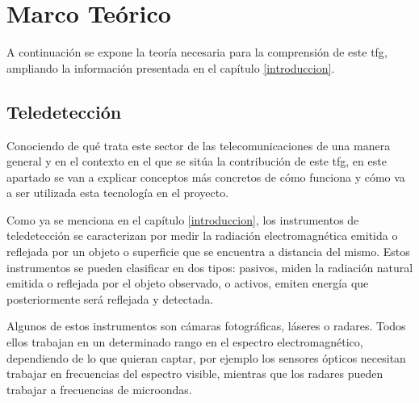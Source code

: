 

\chapter{Marco Teórico}
\label{marcoteorico}
\par A continuación se expone la teoría necesaria para la comprensión de este \gls{tfg}, ampliando la información presentada en el capítulo \ref{introduccion}.

\section{Teledetección}
\par Conociendo de qué trata este sector de las telecomunicaciones de una manera general y en el contexto en el que se sitúa la contribución de este \gls{tfg}, en este apartado se van a explicar conceptos más concretos de cómo funciona y cómo va a ser utilizada esta tecnología en el proyecto. 
\\
\par Como ya se menciona en el capítulo \ref{introduccion}, los instrumentos de teledetección se caracterizan por medir la radiación electromagnética emitida o reflejada por un objeto o superficie que se encuentra a distancia del mismo. Estos instrumentos se pueden clasificar en dos tipos: pasivos, miden la radiación natural emitida o reflejada por el objeto observado, o activos, emiten energía que posteriormente será reflejada y detectada.
\\
\par Algunos de estos instrumentos son cámaras fotográficas, láseres o radares. Todos ellos trabajan en un determinado rango en el espectro electromagnético, dependiendo de lo que quieran captar, por ejemplo los sensores ópticos necesitan trabajar en frecuencias del espectro visible, mientras que los radares pueden trabajar a frecuencias de microondas.
